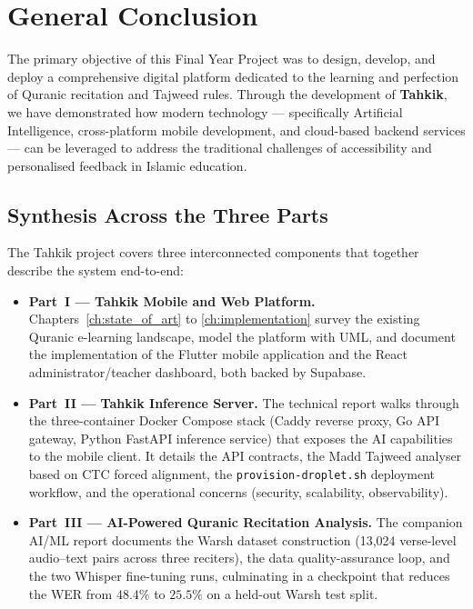\chapter*{General Conclusion}
\label{ch:general_conclusion}

The primary objective of this Final Year Project was to design, develop,
and deploy a comprehensive digital platform dedicated to the learning and
perfection of Quranic recitation and Tajweed rules. Through the
development of \textbf{Tahkik}, we have demonstrated how modern technology
--- specifically Artificial Intelligence, cross-platform mobile
development, and cloud-based backend services --- can be leveraged to
address the traditional challenges of accessibility and personalised
feedback in Islamic education.

\section*{Synthesis Across the Three Parts}

The Tahkik project covers three interconnected components that together
describe the system end-to-end:

\begin{itemize}
  \item \textbf{Part~I --- Tahkik Mobile and Web Platform.}
        Chapters~\ref{ch:state_of_art} to \ref{ch:implementation}
        survey the existing Quranic e-learning landscape, model the
        platform with UML, and document the implementation of the Flutter
        mobile application and the React administrator/teacher
        dashboard, both backed by Supabase.
  \item \textbf{Part~II --- Tahkik Inference Server.}
        The technical report walks through the three-container Docker
        Compose stack (Caddy reverse proxy, Go API gateway, Python
        FastAPI inference service) that exposes the AI capabilities to
        the mobile client. It details the API contracts, the Madd
        Tajweed analyser based on CTC forced alignment, the
        \texttt{provision-droplet.sh} deployment workflow, and the
        operational concerns (security, scalability, observability).
  \item \textbf{Part~III --- AI-Powered Quranic Recitation Analysis.}
        The companion AI/ML report documents the Warsh dataset
        construction (13{,}024 verse-level audio--text pairs across
        three reciters), the data quality-assurance loop, and the two
        Whisper fine-tuning runs, culminating in a checkpoint that
        reduces the WER from $48.4\%$ to $25.5\%$ on a held-out Warsh
        test split.
\end{itemize}

